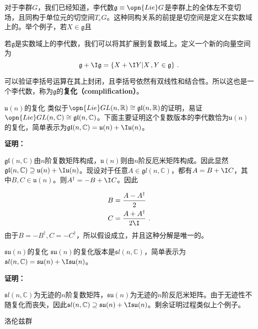 
对于李群$G$，我们已经知道，李代数$\mathfrak g\equiv \opn{Lie} G$是李群上的全体左不变切场，且同构于单位元的切空间$T_e G$。这种同构关系的前提是切空间是定义在实数域上的。举个例子，若$X\in \mathfrak g$且
\begin{definition}{}
若$\mathfrak g$是实数域上的李代数，我们可以将其扩展到复数域上。定义一个新的向量空间为
\begin{equation}
\mathfrak g+\I \mathfrak g=\{X+\I Y|X\,,Y\in\mathfrak g\}~.
\end{equation}
\end{definition}
可以验证李括号运算在其上封闭，且李括号依然有双线性和结合性。所以这也是一个李代数，称为$\mathfrak g$的\textbf{复化（complification）}。
\begin{example}{$\mathfrak u(n)$的复化}
类似于$\opn{Lie}GL(n,\mathbb R)\cong \mathfrak{gl}(n,\mathbb R)$的证明，易证$\opn{Lie}GL(n,\mathbb C)\cong \mathfrak{gl}(n,\mathbb C)$。下面主要证明这个复数版本的李代数恰为$\mathfrak u(n)$的复化，简单表示为$\mathfrak{gl}(n,\mathbb C)=\mathfrak u(n)+\I \mathfrak u(n)$。

\textbf{证明：}

$\mathfrak{gl}(n,\mathbb C)$由$n$阶复数矩阵构成，$\mathfrak u(n)$则由$n$阶反厄米矩阵构成。因此显然$\mathfrak{gl}(n,\mathbb C)\supseteq \mathfrak u(n)+\I \mathfrak u(n)$。现设对于任意$A\in \mathfrak gl(n,\mathbb C)$，都有$A=B+\I C$，其中$B,C\in \mathfrak u(n)$。则$A^{\dagger}=-B+\I C$。因此

\begin{equation}
\begin{aligned}
B&=\frac{A-A^{\dagger}}{2}\\
C&= \frac{A+A^{\dagger}}{2\I}~.
\end{aligned}
\end{equation}
由于$B=-B^{\dagger},C=-C^{\dagger}$，所以假设成立，并且这种分解是唯一的。

\end{example}
\begin{example}{$\mathfrak {su}(n)$的复化}
$\mathfrak {su}(n)$的复化版本是$\mathfrak sl(n,\mathbb C)$，简单表示为$\mathfrak sl(n,\mathbb C)=\mathfrak {su}(n)+\I \mathfrak {su}(n)$。

\textbf{证明：}

$\mathfrak sl(n,\mathbb C)$为无迹的$n$阶复数矩阵，$\mathfrak {su}(n)$为无迹的$n$阶反厄米矩阵。由于无迹性不随复化而丧失，因此$\mathfrak sl(n,\mathbb C)\supseteq \mathfrak {su}(n)+\I \mathfrak {su}(n)$。剩余证明过程类似上个例子。
\end{example}
\begin{example}{洛伦兹群}

\end{example}